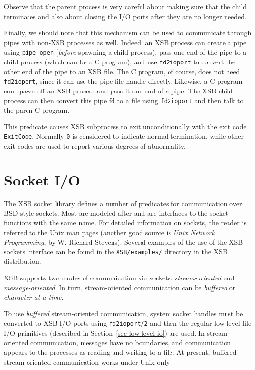 \begin{description}
    Observe that the parent process is very careful about making sure that
    the child terminates and also about closing the I/O ports after they
    are no longer needed.
    
    Finally, we should note that this mechanism can be used to communicate
    through pipes with non-XSB processes as well. Indeed, an XSB process
    can create a pipe using {\tt pipe\_open} (\emph{before} spawning a
    child process), pass one end of the pipe to a child process (which can
    be a C program), and use {\tt fd2ioport} to convert the other end of
    the pipe to an XSB file. The C program, of course, does not need {\tt
      fd2ioport}, since it can use the pipe file handle directly. Likewise,
    a C program can spawn off an XSB process and pass it one end of a pipe.
    The XSB child-process can then convert this pipe fd to a file using
    {\tt fd2ioport} and then talk to the paren C program.

This predicate causes XSB subprocess to exit unconditionally with the exit
code {\tt ExitCode}. Normally {\tt 0} is considered to indicate normal
termination, while other exit codes are used to report various degrees of
abnormality.
\end{description}



\section{Socket I/O}

The XSB socket library defines a number of predicates for communication
over BSD-style sockets. Most are modeled after and are interfaces to the
socket functions with the same name. For detailed information on sockets,
the reader is referred to the Unix man pages (another good source is
\emph{Unix Network Programming}, by W.  Richard Stevens).  Several examples
of the use of the XSB sockets interface can be found in the {\tt XSB/examples/}
directory in the XSB distribution.


XSB supports two modes of communication via sockets: \emph{stream-oriented}
and \emph{message-oriented}. In turn, stream-oriented communication can be
\emph{buffered} or \emph{character-at-a-time}.

To use \emph{buffered} stream-oriented communication, system socket
handles must be converted to XSB I/O ports using {\tt fd2ioport/2} and then
the regular low-level file I/O primitives (described in
Section~\ref{sec-low-level-io}) are used. In stream-oriented communication,
messages have no boundaries, and communication appears to the processes
as reading and writing to a file.  At present, buffered stream-oriented
communication works under Unix only.

